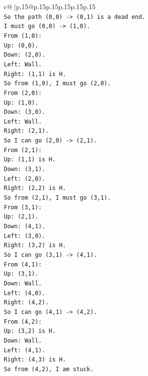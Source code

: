\documentclass{article}
\begin{document}
{\begin{supertabular}{c@{$\;$}|p{.15\linewidth}@{}p{.15\linewidth}p{.15\linewidth}p{.15\linewidth}p{.15\linewidth}p{.15\linewidth}}
{{{\\ 
\texttt{So the path (0,0) {-}> (0,1) is a dead end.} \\
\texttt{I must go (0,0) {-}> (1,0).} \\
\texttt{From (1,0):} \\
\texttt{Up: (0,0).} \\
\texttt{Down: (2,0).} \\
\texttt{Left: Wall.} \\
\texttt{Right: (1,1) is H.} \\
\texttt{So from (1,0), I must go (2,0).} \\
\texttt{From (2,0):} \\
\texttt{Up: (1,0).} \\
\texttt{Down: (3,0).} \\
\texttt{Left: Wall.} \\
\texttt{Right: (2,1).} \\
\texttt{So I can go (2,0) {-}> (2,1).} \\
\texttt{From (2,1):} \\
\texttt{Up: (1,1) is H.} \\
\texttt{Down: (3,1).} \\
\texttt{Left: (2,0).} \\
\texttt{Right: (2,2) is H.} \\
\texttt{So from (2,1), I must go (3,1).} \\
\texttt{From (3,1):} \\
\texttt{Up: (2,1).} \\
\texttt{Down: (4,1).} \\
\texttt{Left: (3,0).} \\
\texttt{Right: (3,2) is H.} \\
\texttt{So I can go (3,1) {-}> (4,1).} \\
\texttt{From (4,1):} \\
\texttt{Up: (3,1).} \\
\texttt{Down: Wall.} \\
\texttt{Left: (4,0).} \\
\texttt{Right: (4,2).} \\
\texttt{So I can go (4,1) {-}> (4,2).} \\
\texttt{From (4,2):} \\
\texttt{Up: (3,2) is H.} \\
\texttt{Down: Wall.} \\
\texttt{Left: (4,1).} \\
\texttt{Right: (4,3) is H.} \\
\texttt{So from (4,2), I am stuck.} \\
}}}
\end{supertabular}}
\end{document}
